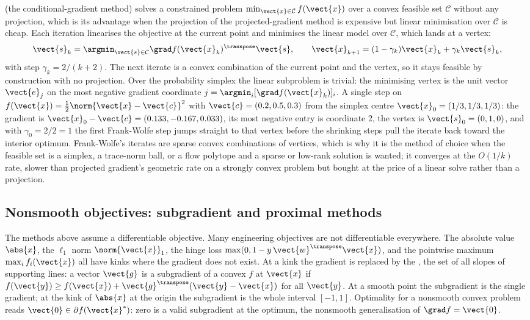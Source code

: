  (the conditional-gradient method) solves a
constrained problem $\min_{\vect{x} \in \mathcal{C}} f(\vect{x})$ over a
convex feasible set $\mathcal{C}$ without any projection, which is its
advantage when the projection of the projected-gradient method is
expensive but linear minimisation over $\mathcal{C}$ is cheap. Each
iteration linearises the objective at the current point and minimises
the linear model over $\mathcal{C}$, which lands at a vertex:
\[
\vect{s}_{k} = \argmin_{\vect{s} \in \mathcal{C}} \grad
f(\vect{x}_{k})^{\transpose} \vect{s}, \qquad
\vect{x}_{k+1} = (1 - \gamma_{k}) \vect{x}_{k} + \gamma_{k}
\vect{s}_{k},
\]
with step $\gamma_{k} = 2/(k+2)$. The next iterate is a convex
combination of the current point and the vertex, so it stays feasible
by construction with no projection. Over the probability simplex the
linear subproblem is trivial: the minimising vertex is the unit vector
$\vect{e}_{j}$ on the most negative gradient coordinate $j =
\argmin_{i} [\grad f(\vect{x}_{k})]_{i}$. A single step on $f(\vect{x})
= \tfrac{1}{2}\norm{\vect{x} - \vect{c}}^{2}$ with $\vect{c} = (0.2,
0.5, 0.3)$ from the simplex centre $\vect{x}_{0} = (1/3, 1/3, 1/3)$: the
gradient is $\vect{x}_{0} - \vect{c} = (0.133, -0.167, 0.033)$, its most
negative entry is coordinate 2, the vertex is $\vect{s}_{0} = (0, 1, 0)$,
and with $\gamma_{0} = 2/2 = 1$ the first Frank-Wolfe step jumps
straight to that vertex before the shrinking steps pull the iterate back
toward the interior optimum. Frank-Wolfe's iterates are sparse convex
combinations of vertices, which is why it is the method of choice when
the feasible set is a simplex, a trace-norm ball, or a flow polytope
and a sparse or low-rank solution is wanted; it converges at the
$O(1/k)$ rate, slower than projected gradient's geometric rate on a
strongly convex problem but bought at the price of a linear solve rather
than a projection.

\subsection{Nonsmooth objectives: subgradient and proximal methods}

The methods above assume a differentiable objective. Many
engineering objectives are not differentiable everywhere. The
absolute value $\abs{x}$, the $\ell_{1}$ norm $\norm{\vect{x}}_{1}$,
the hinge loss $\max(0, 1 - y \, \vect{w}^{\transpose} \vect{x})$,
and the pointwise maximum $\max_{i} f_{i}(\vect{x})$ all have kinks
where the gradient does not exist. At a kink the gradient is
replaced by the , the set of all slopes of
supporting lines: a vector $\vect{g}$ is a subgradient of a convex
$f$ at $\vect{x}$ if $f(\vect{y}) \geq f(\vect{x}) +
\vect{g}^{\transpose}(\vect{y} - \vect{x})$ for all $\vect{y}$. At a
smooth point the subgradient is the single gradient; at the kink of
$\abs{x}$ at the origin the subgradient is the whole interval
$[-1, 1]$. Optimality for a nonsmooth convex problem reads
$\vect{0} \in \partial f(\vect{x}^{*})$: zero is a valid
subgradient at the optimum, the nonsmooth generalisation of
$\grad f = \vect{0}$.

